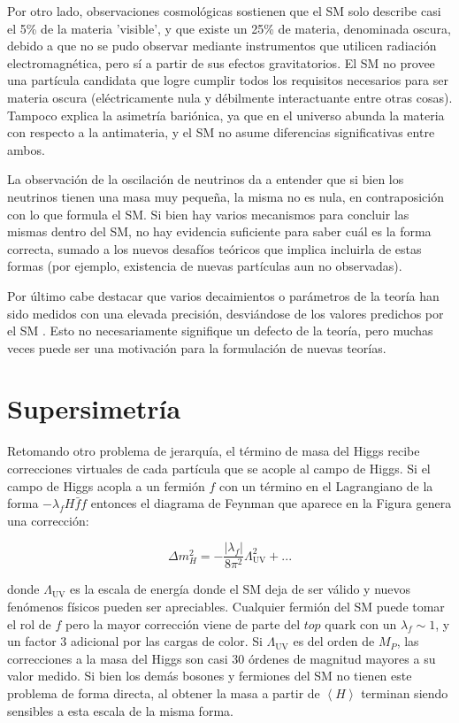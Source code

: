 Por otro lado, observaciones cosmológicas sostienen que el SM solo describe casi el 5\% de la materia 'visible', y que existe un 25\% de materia, denominada oscura, debido a que no se pudo observar mediante instrumentos que utilicen radiación electromagnética, pero sí a partir de sus efectos gravitatorios. El SM no provee una partícula candidata que logre cumplir todos los requisitos necesarios para ser materia oscura (eléctricamente nula y débilmente interactuante entre otras cosas). Tampoco explica la asimetría bariónica, ya que en el universo abunda la materia con respecto a la antimateria, y el SM no asume diferencias significativas entre ambos.

La observación de la oscilación de neutrinos da a entender que si bien los neutrinos tienen una masa muy pequeña, la misma no es nula, en contraposición con lo que formula el SM. Si bien hay varios mecanismos para concluir las mismas dentro del SM, no hay evidencia suficiente para saber cuál es la forma correcta, sumado a los nuevos desafíos teóricos que implica incluirla de estas formas (por ejemplo, existencia de nuevas partículas aun no observadas).

Por último cabe destacar que varios decaimientos o parámetros de la teoría han sido medidos con una elevada precisión, desviándose de los valores predichos por el SM . Esto no necesariamente signifique un defecto de la teoría, pero muchas veces puede ser una motivación para la formulación de nuevas teorías.

\section{Supersimetría}

Retomando otro problema de jerarquía, el término de masa del Higgs recibe correcciones virtuales de cada partícula que se acople al campo de Higgs. Si el campo de Higgs acopla a un fermión $f$ con un término en el Lagrangiano de la forma $-\lambda_f H \bar{f} f$ entonces el diagrama de Feynman que aparece en la Figura  genera una corrección:

\begin{equation}
	\Delta m_H^2 = - \frac{|\lambda_f|}{8 \pi^2}\Lambda_{\text{UV}}^2 + ...
\end{equation}

donde $\Lambda_{\text{UV}}$ es la escala de energía donde el SM deja de ser válido y nuevos fenómenos físicos pueden ser apreciables. Cualquier fermión del SM puede tomar el rol de $f$ pero la mayor corrección viene de parte del $top$ quark con un $\lambda_f\sim1$, y un factor 3 adicional por las cargas de color. Si $\Lambda_{\text{UV}}$ es del orden de $M_P$, las correcciones a la masa del Higgs son casi 30 órdenes de magnitud mayores a su valor medido. Si bien los demás bosones y fermiones del SM no tienen este problema de forma directa, al obtener la masa a partir de $\left<H\right>$ terminan siendo sensibles a esta escala de la misma forma.

